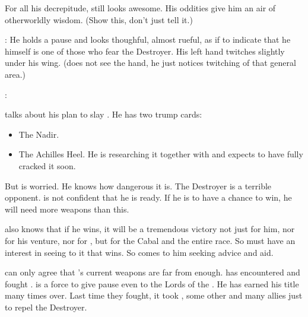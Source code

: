 For all his decrepitude, \Azraid still looks awesome.
His oddities give him an air of otherworldly wisdom. 
(Show this, don't just tell it.)

\Azraid:
He holds a pause and looks thoughful, almost rueful, as if to indicate that he himself is one of those \satharioth who fear the Destroyer. 
His left hand twitches slightly under his wing.
(\Teshrial does not see the hand, he just notices twitching of that general area.)

\Azraid: 





\begin{comment}
  \subsection{Teshrial asks for help}
\end{comment}

\Teshrial{} talks about his plan to slay \Ishnaruchaefir. 
He has two trump cards:
\begin{itemize}
  \item The Nadir. 
  \item The Achilles Heel. 
    He is researching it together with \Urizeth and expects to have fully cracked it soon.
\end{itemize}

But \Teshrial is worried. 
He knows how dangerous it is.
The Destroyer is a terrible opponent. 
\Teshrial is not confident that he is ready. 
If he is to have a chance to win, he will need more weapons than this. 

\Teshrial also knows that if he wins, it will be a tremendous victory not just for him, nor for his \Malcur venture, nor for \CiriathSepher, but for the Cabal and the entire \resphan race. 
So \Azraid must have an interest in seeing to it that \Teshrial wins. 
So \Teshrial comes to him seeking advice and aid. 

\Azraid can only agree that \Teshrial's current weapons are far from enough. 
\Azraid has encountered and fought \Ishnaruchaefir. 
\Ishnaruchaefir is a force to give pause even to the Lords of the \SitraAchra. 
He has earned his title  many times over. 
Last time they fought, it took \Azraid, some other \satharioth and many allies just to repel the Destroyer. 

